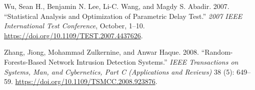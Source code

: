 \documentclass[
  a4paper,
  12pt]{article}
\newlength{\cslhangindent}
\newenvironment{CSLReferences}[2] %
 {\begin{list}{}{%
  \setlength{\itemindent}{0pt}
  \setlength{\leftmargin}{0pt}
  \setlength{\parsep}{0pt}
  \ifodd #1
   \setlength{\leftmargin}{\cslhangindent}
   \setlength{\itemindent}{-1\cslhangindent}
  \fi
  \setlength{\itemsep}{#2\baselineskip}}}
 {\end{list}}
\begin{document}
\begin{CSLReferences}{1}{1}
Wu, Sean H., Benjamin N. Lee, Li-C. Wang, and Magdy S. Abadir. 2007.
{``Statistical Analysis and Optimization of Parametric Delay Test.''}
\emph{2007 IEEE International Test Conference}, October, 1--10.
\url{https://doi.org/10.1109/TEST.2007.4437626}.

Zhang, Jiong, Mohammad Zulkernine, and Anwar Haque. 2008.
{``Random-Forests-Based Network Intrusion Detection Systems.''}
\emph{IEEE Transactions on Systems, Man, and Cybernetics, Part C
(Applications and Reviews)} 38 (5): 649--59.
\url{https://doi.org/10.1109/TSMCC.2008.923876}.

\end{CSLReferences}
\end{document}
